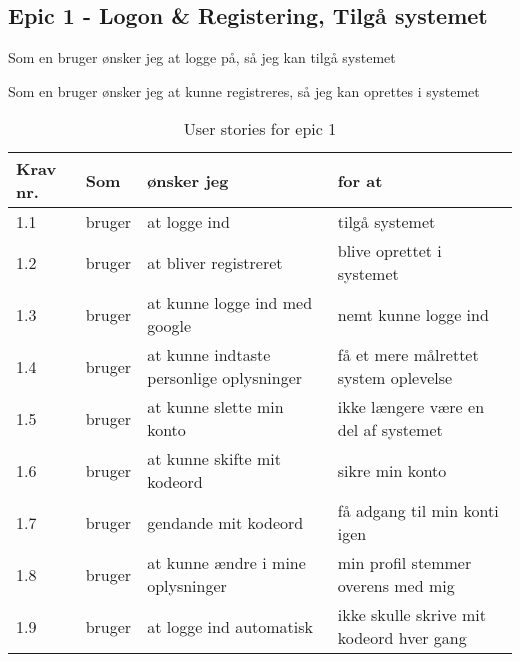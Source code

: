 \subsection{Epic 1 - Logon \& Registering, Tilgå systemet}

Som en bruger ønsker jeg at logge på, så jeg kan tilgå systemet

Som en bruger ønsker jeg at kunne registreres, så jeg kan oprettes i systemet

\begin{table}[H]
    \centering
    \caption{User stories for epic 1}
    \label{tab:us-epic1}
    \begin{tabular}{l|l|l|l}
        \textbf{Krav nr.} & \textbf{Som} & \textbf{ønsker jeg}                      & \textbf{for at}                          \\
        \hline
        1.1               & bruger       & at logge ind                             & tilgå systemet                           \\
        \hline
        1.2               & bruger       & at bliver registreret                    & blive oprettet i systemet                \\
        \hline
        1.3               & bruger       & at kunne logge ind med google            & nemt kunne logge ind                     \\
        \hline
        1.4               & bruger       & at kunne indtaste personlige oplysninger & få et mere målrettet system oplevelse    \\
        \hline
        1.5               & bruger       & at kunne slette min konto                & ikke længere være en del af systemet     \\
        \hline
        1.6               & bruger       & at kunne skifte mit kodeord              & sikre min konto                          \\
        \hline
        1.7               & bruger       & gendande mit kodeord                     & få adgang til min konti igen             \\
        \hline
        1.8               & bruger       & at kunne ændre i mine oplysninger        & min profil stemmer overens med mig       \\
        \hline
        1.9               & bruger       & at logge ind automatisk                  & ikke skulle skrive mit kodeord hver gang \\
    \end{tabular}
\end{table}

